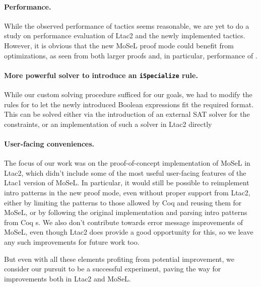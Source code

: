 \paragraph{Performance.}
  While the observed performance of tactics seems reasonable, we are yet to do a study on performance evaluation of Ltac2 and the newly implemented tactics.
  However, it is obvious that the new MoSeL proof mode could benefit from optimizations, as seen from both larger proofs and, in particular, performance of .
\paragraph{More powerful solver to introduce an \texttt{iSpecialize} rule.}
  While our custom solving procedure sufficed for our goals, we had to modify the rules for  to let the newly introduced Boolean expressions fit the required format.
  This can be solved either via the introduction of an external SAT solver for the constraints, or an implementation of such a solver in Ltac2 directly
\paragraph{User-facing conveniences.}
  The focus of our work was on the proof-of-concept implementation of MoSeL in Ltac2, which didn't include some of the most useful user-facing features of the Ltac1 version of MoSeL.
  In particular, it would still be possible to reimplement intro patterns in the new proof mode, even without proper support from Ltac2, either by limiting the patterns to those allowed by Coq and reusing them for MoSeL, or by following the original implementation and parsing intro patterns from Coq s.
  We also don't contribute towards error message improvements of MoSeL, even though Ltac2 does provide a good opportunity for this, so we leave any such improvements for future work too.

But even with all these elements profiting from potential improvement, we consider our pursuit to be a successful experiment, paving the way for improvements both in Ltac2 and MoSeL.

